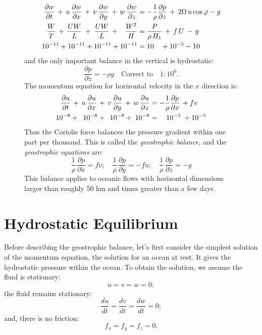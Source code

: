 \begin{figure} [t!]
{{\begin{minipage}{11.5cm}
\begin{align}
\frac{\partial w}{\partial t}\,+\,u\,\frac{\partial w}{\partial x}\,+\,v\,
\frac{\partial w}{\partial y}\,+\,w\,\frac{\partial w}{\partial z}&
=-\frac{1}{\rho}\frac{\partial p}{\partial z}\,+\,2\Omega \, u \cos\varphi -g
\notag\\ \notag
\frac{W}{T}\,+\,\frac{UW}{L}\;+\;\frac{UW}{L}\,+\;\;\;\frac{W^2}{H}&=\frac{P}{\rho\,H_1}\,+\,f\,U\,-\,g
\notag\\ \notag 10^{-11} + 10^{-11} + 10^{-11} + 10^{-11} & =10\quad + 10^{-5} - 10
\notag
\end{align}
and the only important balance in the vertical is hydrostatic:
\begin{displaymath}
\frac{\partial p}{\partial z}=-\rho g \quad \text{Correct to}\quad 1:10^6.
\end{displaymath}
The momentum equation for horizontal velocity in the $x$ direction is:
\begin{align}
\frac{\partial u}{\partial t}\,+\,u\,\frac{\partial u}{\partial
x}\,+\,v\,\frac{\partial u}{\partial y}\,+\,w\,\frac{\partial u} {\partial z} &
=-\frac{1}{\rho}\frac{\partial p}{\partial x}\,+fv \notag\\ \notag 10^{-8} +\;\;
10^{-8} + \:\;10^{-8} + \;10^{-8} & =\quad 10^{-5}\; + 10^{-5}
\notag
\end{align}
Thus the Coriolis force balances the pressure gradient within one part
per thousand. This is called the \textit{geostrophic
  balance}, and the
\textit{geostrophic equations}
are:
\begin{displaymath}
\frac{1}{\rho}\,\frac{\partial p}{\partial x}  =f v; \quad
\frac{1}{\rho}\,\frac{\partial p}{\partial y}  =-f u; \quad
\frac{1}{\rho}\,\frac{\partial p}{\partial z}  = -g
\end{displaymath} \notag
This balance applies to oceanic flows with horizontal dimensions
larger than roughly 50 km and times greater than a few days.
\vspace{0.7ex}
\end{minipage}}}
\vspace{-5ex}
\end{figure}


\section{Hydrostatic Equilibrium}
Before describing the geostrophic
balance, let's first consider the simplest solution of the momentum
equation, the solution for an ocean at rest. It gives the hydrostatic
pressure within the ocean. To obtain the solution, we assume the fluid
is stationary:
\begin{equation}
 u=v=w=0;
\end{equation}
the fluid remains stationary:
\begin{equation}
\frac{du}{dt}=\frac{dv}{dt}=\frac{dw}{dt} = 0;
\end{equation}
and, there is no friction:
\begin{equation}
f_x=f_y=f_z=0.
\end{equation}

